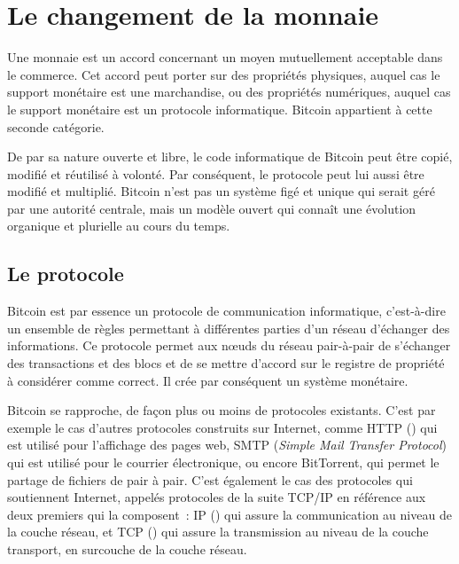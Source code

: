 
\chapter{Le changement de la monnaie}
\label{ch:changement}

Une monnaie est un accord concernant un moyen mutuellement acceptable dans le commerce. Cet accord peut porter sur des propriétés physiques, auquel cas le support monétaire est une marchandise, ou des propriétés numériques, auquel cas le support monétaire est un protocole informatique. Bitcoin appartient à cette seconde catégorie.

De par sa nature ouverte et libre, le code informatique de Bitcoin peut être copié, modifié et réutilisé à volonté. Par conséquent, le protocole peut lui aussi être modifié et multiplié. Bitcoin n'est pas un système figé et unique qui serait géré par une autorité centrale, mais un modèle ouvert qui connaît une évolution organique et plurielle au cours du temps.

\section*{Le protocole}

Bitcoin est par essence un protocole de communication informatique, c'est-à-dire un ensemble de règles permettant à différentes parties d'un réseau d'échanger des informations. Ce protocole permet aux nœuds du réseau pair-à-pair de s'échanger des transactions et des blocs et de se mettre d'accord sur le registre de propriété à considérer comme correct. Il crée par conséquent un système monétaire.

Bitcoin se rapproche, de façon plus ou moins de protocoles existants. C'est par exemple le cas d'autres protocoles construits sur Internet, comme HTTP () qui est utilisé pour l'affichage des pages web, SMTP (\emph{Simple Mail Transfer Protocol}) qui est utilisé pour le courrier électronique, ou encore BitTorrent, qui permet le partage de fichiers de pair à pair. C'est également le cas des protocoles qui soutiennent Internet, appelés protocoles de la suite TCP/IP en référence aux deux premiers qui la composent~: IP () qui assure la communication au niveau de la couche réseau, et TCP () qui assure la transmission au niveau de la couche transport, en surcouche de la couche réseau.


